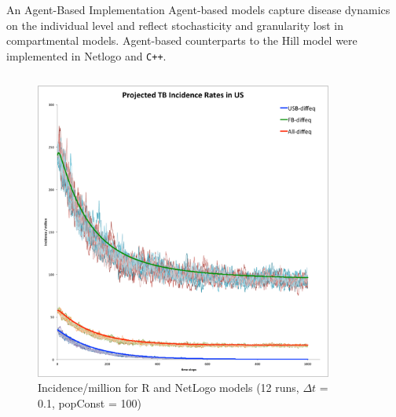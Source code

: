 \documentclass[final]{beamer}
\begin{document}
\begin{frame}
\begin{columns}[T]
    \begin{column}{.3\textwidth}
      \begin{block}{An Agent-Based Implementation}
        Agent-based models capture disease dynamics on the individual level and
        reflect stochasticity and granularity lost in compartmental models.
        Agent-based counterparts to the Hill model were implemented in Netlogo
        and \texttt{C++}.
        \begin{columns}
          \begin{column}{.45\textwidth}
            \begin{figure}[h]
              \begin{center}
                \includegraphics[width=\textwidth]{NLHMinc}
              \end{center}
              \caption{Incidence/million for R and NetLogo models (12 runs, $\Delta t$ = 0.1, popConst = 100)}
              \label{fig:NLHMinc}
            \end{figure}
          \end{column}
          \begin{column}{.45\textwidth}
            \begin{figure}[h]

\end{figure}
\end{column}
\end{columns}
\end{block}
\end{column}
\end{columns}
\end{frame}
\end{document}
